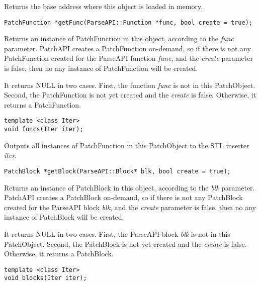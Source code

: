 Returns the base address where this object is loaded in memory.


\begin{verbatim}
PatchFunction *getFunc(ParseAPI::Function *func, bool create = true);

\end{verbatim}



Returns an instance of PatchFunction in this object, according to the \emph{func}
parameter. PatchAPI creates a PatchFunction on-demand, so if there is not any
PatchFunction created for the ParseAPI function \emph{func}, and the \emph{create}
parameter is false, then no any instance of PatchFunction will be created.

It returns NULL in two cases. First, the function \emph{func} is not in this
PatchObject. Second, the PatchFunction is not yet created and the \emph{create} is
false. Otherwise, it returns a PatchFunction.


\begin{verbatim}
template <class Iter>
void funcs(Iter iter);

\end{verbatim}



Outputs all instances of PatchFunction in this PatchObject to the STL inserter
\emph{iter}.


\begin{verbatim}
PatchBlock *getBlock(ParseAPI::Block* blk, bool create = true);

\end{verbatim}



Returns an instance of PatchBlock in this object, according to the \emph{blk}
parameter. PatchAPI creates a PatchBlock on-demand, so if there is not any
PatchBlock created for the ParseAPI block \emph{blk}, and the \emph{create} parameter is
false, then no any instance of PatchBlock will be created.

It returns NULL in two cases. First, the ParseAPI block \emph{blk} is not in this
PatchObject. Second, the PatchBlock is not yet created and the \emph{create} is
false. Otherwise, it returns a PatchBlock.


\begin{verbatim}
template <class Iter>
void blocks(Iter iter);

\end{verbatim}



